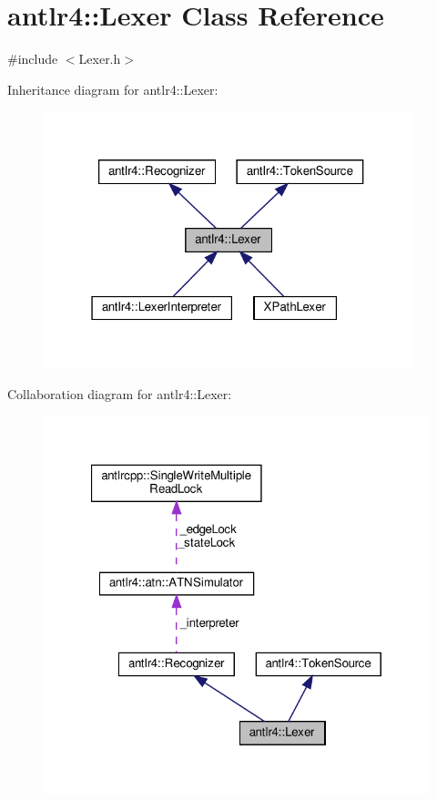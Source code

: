 \hypertarget{classantlr4_1_1Lexer}{}\section{antlr4\+:\+:Lexer Class Reference}
\label{classantlr4_1_1Lexer}


{\ttfamily \#include $<$Lexer.\+h$>$}



Inheritance diagram for antlr4\+:\+:Lexer\+:
\nopagebreak
\begin{figure}[H]
\begin{center}
\leavevmode
\includegraphics[width=304pt]{classantlr4_1_1Lexer__inherit__graph}
\end{center}
\end{figure}


Collaboration diagram for antlr4\+:\+:Lexer\+:
\nopagebreak
\begin{figure}[H]
\begin{center}
\leavevmode
\includegraphics[width=321pt]{classantlr4_1_1Lexer__coll__graph}
\end{center}
\end{figure}
